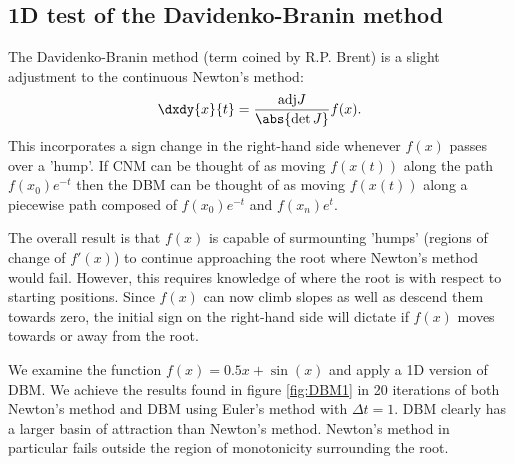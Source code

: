\documentclass{book}
\begin{document}
\subsection{1D test of the Davidenko-Branin method}

The Davidenko-Branin method (term coined by R.P. Brent) is a slight adjustment to the continuous Newton's method:
\begin{equation*}
\dxdy{x}{t} = \frac{ \text{adj} J}{\abs{ \det J} } f(x) .
\end{equation*}
This incorporates a sign change in the right-hand side whenever $f(x)$ passes over a 'hump'.
If CNM can be thought of as moving $f(x(t))$ along the path $f(x_0) e^{-t}$ then the DBM can be thought of as moving $f(x(t))$ along a piecewise path composed of $f(x_0) e^{-t}$ and $f(x_n) e^t$.

The overall result is that $f(x)$ is capable of surmounting 'humps' (regions of change of $f'(x)$) to continue approaching the root where Newton's method would fail.
However, this requires knowledge of where the root is with respect to starting positions.
Since $f(x)$ can now climb slopes as well as descend them towards zero, the initial sign on the right-hand side will dictate if $f(x)$ moves towards or away from the root.

We examine the function $f(x) = 0.5x + \sin(x)$ and apply a 1D version of DBM.
We achieve the results found in figure \ref{fig:DBM1} in 20 iterations of both Newton's method and DBM using Euler's method with $\Delta t = 1$.
DBM clearly has a larger basin of attraction than Newton's method.
Newton's method in particular fails outside the region of monotonicity surrounding the root.
\end{document}
